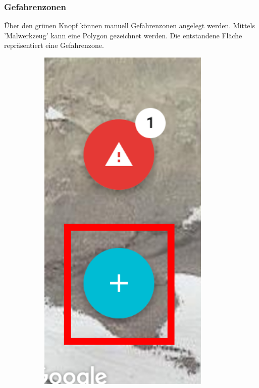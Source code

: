 \documentclass[11pt,english,german]{report}
\theoremstyle{definition}
\begin{document}
\newpage 
\subsubsection{Gefahrenzonen}
Über den grünen Knopf können manuell Gefahrenzonen angelegt werden. Mittels 'Malwerkzeug' kann eine Polygon gezeichnet werden. Die entstandene Fläche repräsentiert eine Gefahrenzone.
\begin{figure}[H]
	\centering
	\begin{subfigure}{.2\textwidth}
		\centering
		\includegraphics[width=0.9\textwidth]{img/atasweb/atas-web-addDangerzone.png}

\end{subfigure}
\end{figure}
\end{document}
